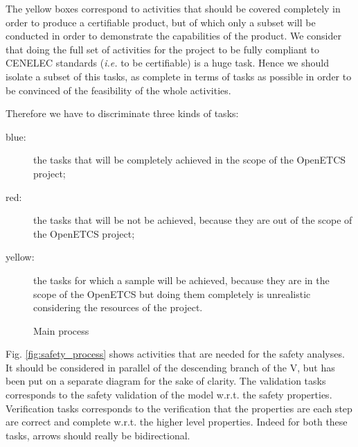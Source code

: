 \documentclass{template/openetcs_article}
\begin{document}
The yellow boxes correspond to activities that should be covered completely in order to produce 
a certifiable product, but of which only a subset will be conducted in order to demonstrate the 
capabilities of the product. We consider that doing the full set of activities for the project to 
be fully compliant to CENELEC standards (\emph{i.e.} to be certifiable) is a huge task. Hence we 
should isolate a subset of this tasks, as complete in terms of tasks as possible in order to be 
convinced of the feasibility of the whole activities. 

Therefore we have to discriminate three kinds of tasks:
\begin{description}
\item[blue:] the tasks that will be completely achieved in the scope of the OpenETCS project;
\item[red:] the tasks that will be not be achieved, because they are out of the scope of the OpenETCS project;
\item[yellow:] the tasks for which a sample will be achieved, because they are in the scope of the 
OpenETCS but doing them completely is unrealistic considering the resources of the project.
\end{description}

\begin{figure}
  \centering
  \caption{Main process}
  \label{fig:main_process}
\end{figure}

Fig. \ref{fig:safety_process} shows activities that are needed for the safety analyses. It should 
be considered in parallel of the descending branch of the V, but has been put on a separate diagram for
the sake of clarity. The validation tasks corresponds to the safety validation of the model w.r.t. 
the safety properties. Verification tasks corresponds to the verification that the properties are each
step are correct and complete w.r.t. the higher level properties. Indeed for both these tasks, arrows should 
really be bidirectional.
\end{document}
